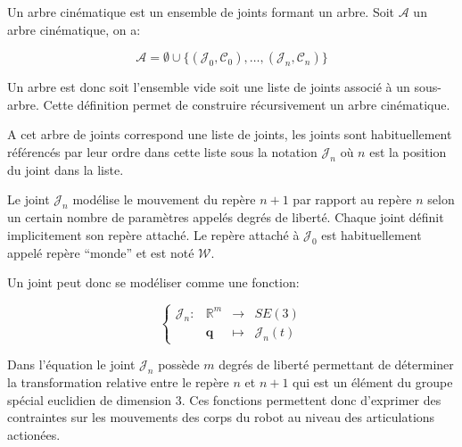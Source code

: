 \begin{mydef}
  Un arbre cinématique est un ensemble de joints formant un arbre.
  Soit $\mathcal{A}$ un arbre cinématique, on a:

  \begin{equation}
    \mathcal{A} = \emptyset \cup \{ (\mathcal{J}_0, \mathcal{C}_0),
    \dotsc, (\mathcal{J}_n, \mathcal{C}_n) \}
  \end{equation}

  Un arbre est donc soit l'ensemble vide soit une liste de joints
  associé à un sous-arbre. Cette définition permet de construire
  récursivement un arbre cinématique.

  A cet arbre de joints correspond une liste de joints, les joints
  sont habituellement référencés par leur ordre dans cette liste sous
  la notation $\mathcal{J}_n$ où $n$ est la position du joint dans la
  liste.
\end{mydef}

\begin{mydef}
  Le joint $\mathcal{J}_n$ modélise le mouvement du repère $n+1$ par
  rapport au repère $n$ selon un certain nombre de paramètres appelés
  degrés de liberté. Chaque joint définit implicitement son repère
  attaché. Le repère attaché à $\mathcal{J}_0$ est habituellement
  appelé repère ``monde'' et est noté $\mathcal{W}$.

  Un joint peut donc se modéliser comme une fonction:

  \begin{equation}
    \left\{
    \begin{array}{cccc}
      \mathcal{J}_n : & \mathbb{R}^m & \rightarrow & SE(3)\\
      & \mathbf{q} & \mapsto & \mathcal{J}_n(t)
    \end{array}
    \right.
  \end{equation}

  Dans l'équation le joint $\mathcal{J}_n$ possède $m$ degrés de
  liberté permettant de déterminer la transformation relative entre le
  repère $n$ et $n + 1$ qui est un élément du groupe spécial euclidien
  de dimension 3. Ces fonctions permettent donc d'exprimer des
  contraintes sur les mouvements des corps du robot au niveau des
  articulations actionées.
\end{mydef}


